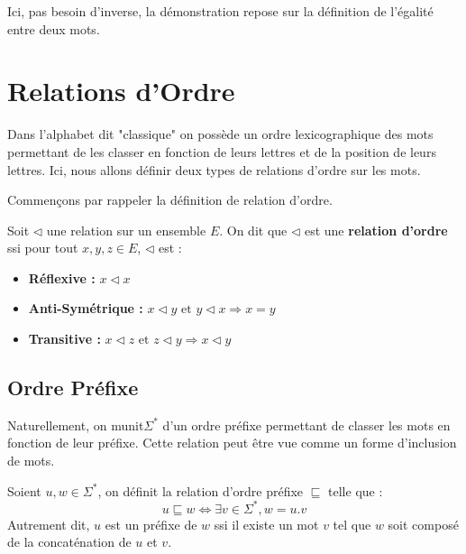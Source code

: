 Ici, pas besoin d'inverse, la démonstration repose sur la définition de l'égalité entre deux mots. 


\newpage 

\section{Relations d'Ordre}

Dans l'alphabet dit "classique" on possède un ordre lexicographique des mots permettant de les classer 
en fonction de leurs lettres et de la position de leurs lettres. 
Ici, nous allons définir deux types de relations d'ordre sur les mots. 

Commençons par rappeler la définition de relation d'ordre. 

\begin{definition}
    Soit $\lhd $ une relation sur un ensemble $E$. On dit que $\lhd$ est une \textbf{relation d'ordre} ssi 
    pour tout $x,y,z \in E$, $\lhd$ est :
    \begin{itemize}
        \item \textbf{Réflexive : } $ x \lhd x $ 
        \item \textbf{Anti-Symétrique : } $ x \lhd y \text{ et } y \lhd x \Longrightarrow x = y $ 
        \item \textbf{Transitive : } $x \lhd z \text{ et } z \lhd y \Longrightarrow x \lhd y $ 
    \end{itemize}
\end{definition}

\subsection{Ordre Préfixe}

Naturellement, on munit$ \Sigma^*$ d'un ordre préfixe permettant de classer les mots en fonction de leur préfixe. 
Cette relation peut être vue comme un forme d'inclusion de mots. 

\begin{definition}
    Soient $u,w \in \Sigma^*$, on définit la relation d'ordre préfixe $\sqsubseteq$ telle que :
        \[ \boxed{u \sqsubseteq w \iff \exists v \in \Sigma^*, w = u.v} \] 
    Autrement dit, $u$ est un préfixe de $w$ ssi il existe un mot $v$ tel que $w$ soit composé de 
    la concaténation de $u$ et $v$. 
\end{definition}

